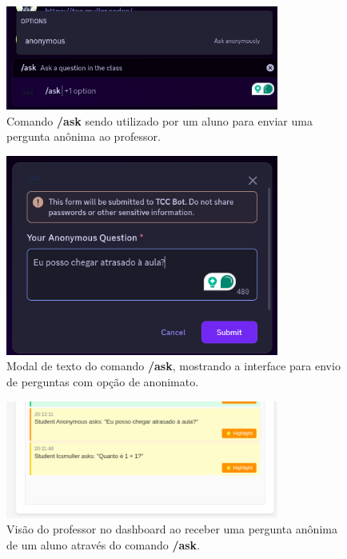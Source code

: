 \begin{figure}[H]
\centering
\includegraphics[width=0.8\textwidth]{func-alunos/comando-ask.png}
\caption{Comando \textbf{/ask} sendo utilizado por um aluno para enviar uma pergunta anônima ao professor.}
\label{fig:func-alunos-ask}
\end{figure}

\begin{figure}[H]
\centering
\includegraphics[width=0.8\textwidth]{func-alunos/comando-ask-modal.png}
\caption{Modal de texto do comando \textbf{/ask}, mostrando a interface para envio de perguntas com opção de anonimato.}
\label{fig:func-alunos-ask-modal}
\end{figure}

\begin{figure}[H]
\centering
\includegraphics[width=0.8\textwidth]{func-alunos/comando-ask-visao-dashboard.png}
\caption{Visão do professor no dashboard ao receber uma pergunta anônima de um aluno através do comando \textbf{/ask}.}
\label{fig:func-alunos-ask-dashboard}
\end{figure}

